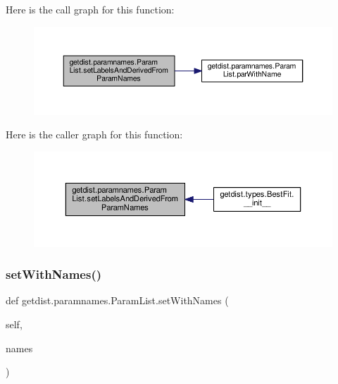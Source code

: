 Here is the call graph for this function\+:
\nopagebreak
\begin{figure}[H]
\begin{center}
\leavevmode
\includegraphics[width=350pt]{classgetdist_1_1paramnames_1_1ParamList_a1c0f1ff83138b0ff5a99c21d43314888_cgraph}
\end{center}
\end{figure}
Here is the caller graph for this function\+:
\nopagebreak
\begin{figure}[H]
\begin{center}
\leavevmode
\includegraphics[width=350pt]{classgetdist_1_1paramnames_1_1ParamList_a1c0f1ff83138b0ff5a99c21d43314888_icgraph}
\end{center}
\end{figure}
\mbox{\label{classgetdist_1_1paramnames_1_1ParamList_acb0a00bef91d544a51535273654fc815}} 
\subsubsection{\texorpdfstring{set\+With\+Names()}{setWithNames()}}
{\footnotesize\ttfamily def getdist.\+paramnames.\+Param\+List.\+set\+With\+Names (\begin{DoxyParamCaption}\item[{}]{self,  }\item[{}]{names }\end{DoxyParamCaption})}



